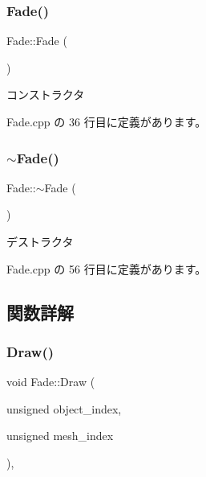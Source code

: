 \subsubsection{\texorpdfstring{Fade()}{Fade()}}
{\footnotesize\ttfamily Fade\+::\+Fade (\begin{DoxyParamCaption}{ }\end{DoxyParamCaption})}



コンストラクタ 



 Fade.\+cpp の 36 行目に定義があります。

\mbox{\label{class_fade_a58ddf7585cb85bf84f5e83adbe2734f9}} 
\subsubsection{\texorpdfstring{$\sim$\+Fade()}{~Fade()}}
{\footnotesize\ttfamily Fade\+::$\sim$\+Fade (\begin{DoxyParamCaption}{ }\end{DoxyParamCaption})}



デストラクタ 



 Fade.\+cpp の 56 行目に定義があります。



\subsection{関数詳解}
\mbox{\label{class_fade_a84a9e688650ac500e03cde74ff0210b8}} 
\subsubsection{\texorpdfstring{Draw()}{Draw()}}
{\footnotesize\ttfamily void Fade\+::\+Draw (\begin{DoxyParamCaption}\item[{unsigned}]{object\+\_\+index,  }\item[{unsigned}]{mesh\+\_\+index }\end{DoxyParamCaption})\hspace{0.3cm}{\ttfamily [override]}, {\ttfamily [virtual]}}



